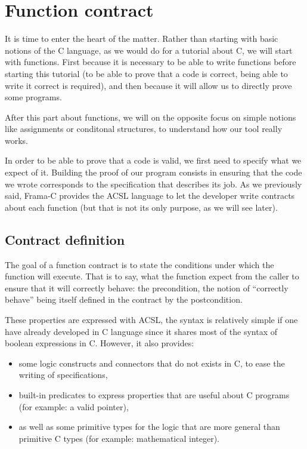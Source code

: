 \documentclass[12pt,francais,]{scrbook}
\providecommand{\tightlist}{%
  \setlength{\itemsep}{0pt}\setlength{\parskip}{0pt}}
\begin{document}
\chapter{Function contract}\label{function-contract}

It is time to enter the heart of the matter. Rather than starting with
basic notions of the C language, as we would do for a tutorial about C,
we will start with functions. First because it is necessary to be able
to write functions before starting this tutorial (to be able to prove
that a code is correct, being able to write it correct is required), and
then because it will allow us to directly prove some programs.

After this part about functions, we will on the opposite focus on simple
notions like assignments or conditonal structures, to understand how our
tool really works.

In order to be able to prove that a code is valid, we first need to
specify what we expect of it. Building the proof of our program consists
in ensuring that the code we wrote corresponds to the specification that
describes its job. As we previously said, Frama-C provides the ACSL
language to let the developer write contracts about each function (but
that is not its only purpose, as we will see later).

\section{Contract definition}\label{contract-definition}

The goal of a function contract is to state the conditions under which
the function will execute. That is to say, what the function expect from
the caller to ensure that it will correctly behave: the precondition,
the notion of ``correctly behave'' being itself defined in the contract
by the postcondition.

These properties are expressed with ACSL, the syntax is relatively
simple if one have already developed in C language since it shares most
of the syntax of boolean expressions in C. However, it also provides:

\begin{itemize}
\tightlist
\item
  some logic constructs and connectors that do not exists in C, to ease
  the writing of specifications,
\item
  built-in predicates to express properties that are useful about C
  programs (for example: a valid pointer),
\item
  as well as some primitive types for the logic that are more general
  than primitive C types (for example: mathematical integer).
\end{itemize}
\end{document}
